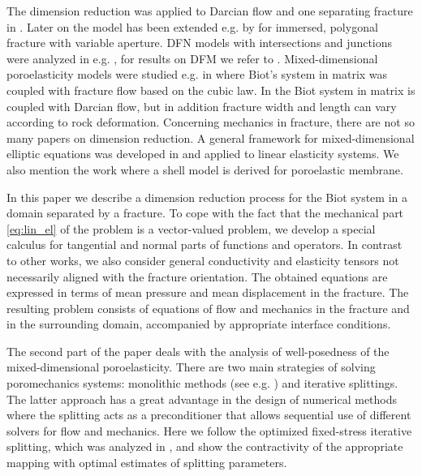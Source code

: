 \documentclass[a4paper]{article}
\numberwithin{equation}{section}
\begin{document}
The dimension reduction was applied to Darcian flow and one separating fracture in \cite{martin_modeling_2005}.
Later on the model has been extended e.g. by \cite{angot2009asymptotic} for immersed, polygonal fracture with variable aperture.
DFN models with intersections and junctions were analyzed in e.g. \cite{maryska2005numerical,pichot2012generalized,formaggia2014reduced}, for results on DFM we refer to \cite{schwenck2015dimensionally}.
% 
Mixed-dimensional poroelasticity models were studied e.g. in \cite{ganis2014modeling} where Biot's system in matrix was coupled with fracture flow based on the cubic law.
In \cite{hanowski2018hydromechanical} the Biot system in matrix is coupled with Darcian flow, but in addition fracture width and length can vary according to rock deformation.
Concerning mechanics in fracture, there are not so many papers on dimension reduction.
A general framework for mixed-dimensional elliptic equations was developed in \cite{boon2017functional,boon2019stable} and applied to linear elasticity systems.
We also mention the work \cite{mikelic2019derivation} where a shell model is derived for poroelastic membrane.

In this paper we describe a dimension reduction process for the Biot system in a domain separated by a fracture.
To cope with the fact that the mechanical part \eqref{eq:lin_el} of the problem is a vector-valued problem, we develop a special calculus for tangential and normal parts of functions and operators.
In contrast to other works, we also consider general conductivity and elasticity tensors not necessarily aligned with the fracture orientation.
The obtained equations are expressed in terms of mean pressure and mean displacement in the fracture.
The resulting problem consists of equations of flow and mechanics in the fracture and in the surrounding domain, accompanied by appropriate interface conditions.

The second part of the paper deals with the analysis of well-posedness of the mixed-dimensional poroelasticity.
There are two main strategies of solving poromechanics systems: monolithic methods (see e.g. \cite{showalter2000diffusion,zenisek1984existence}) and iterative splittings.
The latter approach has a great advantage in the design of numerical methods where the splitting acts as a preconditioner \cite{white2016block} that allows sequential use of different solvers for flow and mechanics.
Here we follow the optimized fixed-stress iterative splitting, which was analyzed in \cite{mikelic2013convergence}, and show the contractivity of the appropriate mapping with optimal estimates of splitting parameters.
\end{document}
